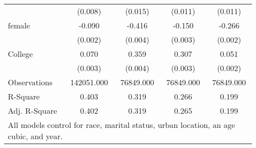 \begin{table}
\begin{tabular}{l*{4}{c}}
                    &     (0.008)         &     (0.015)         &     (0.011)         &     (0.011)         \\
female              &      -0.090\sym{***}&      -0.416\sym{***}&      -0.150\sym{***}&      -0.266\sym{***}\\
                    &     (0.002)         &     (0.004)         &     (0.003)         &     (0.002)         \\
College             &       0.070\sym{***}&       0.359\sym{***}&       0.307\sym{***}&       0.051\sym{***}\\
                    &     (0.003)         &     (0.004)         &     (0.003)         &     (0.002)         \\
\midrule
Observations        &  142051.000         &   76849.000         &   76849.000         &   76849.000         \\
R-Square            &       0.403         &       0.319         &       0.266         &       0.199         \\
Adj. R-Square       &       0.402         &       0.319         &       0.265         &       0.199         \\
\hline
\multicolumn{5}{l}{\small{All models control for race, marital status, urban location, an age cubic, and year.}} \\
\end{tabular}
\end{table}
